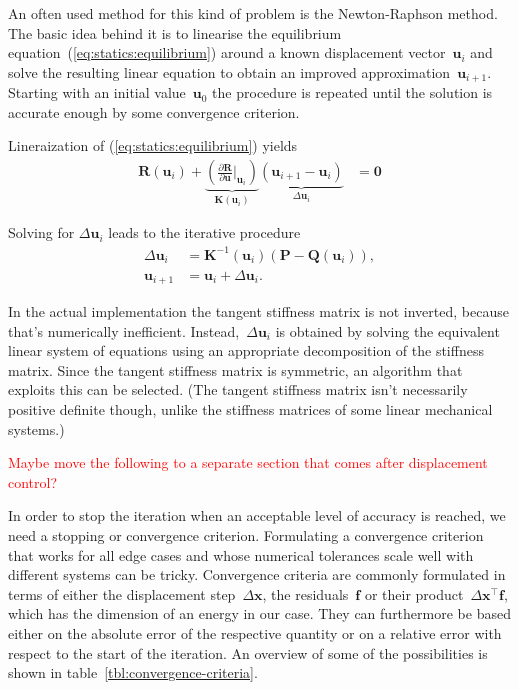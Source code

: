 An often used method for this kind of problem is the Newton-Raphson method. The basic idea behind it is to linearise the equilibrium equation~(\ref{eq:statics:equilibrium}) around a known displacement vector~$\boldsymbol{u}_i$ and solve the resulting linear equation to obtain an improved approximation~$\boldsymbol{u}_{i+1}$. Starting with an initial value~$\boldsymbol{u}_0$ the procedure is repeated until the solution is accurate enough by some convergence criterion.

Lineraization of (\ref{eq:statics:equilibrium}) yields
%
\begin{align}
\boldsymbol{R}(\boldsymbol{u}_i) +
\underbrace{
\left(\frac{\partial \boldsymbol{R}}{\partial \boldsymbol{u}}\bigg \vert_{\boldsymbol{u}_i}\right)
}_{\boldsymbol{K}(\boldsymbol{u}_i)}
\underbrace{
(\boldsymbol{u}_{i+1} - \boldsymbol{u}_i)
}_{\Delta\boldsymbol{u}_i} &= \boldsymbol{0}
\end{align}

Solving for $\Delta\boldsymbol{u}_i$ leads to the iterative procedure
%
\begin{align}
\Delta\boldsymbol{u}_i &= \boldsymbol{K}^{-1}(\boldsymbol{u}_i)\left(\boldsymbol{P} - \boldsymbol{Q}(\boldsymbol{u}_i)\right),\\
\boldsymbol{u}_{i+1} &= \boldsymbol{u}_i + \Delta\boldsymbol{u}_i.\label{eq:statics:newton_iteration}
\end{align}

In the actual implementation the tangent stiffness matrix is not inverted, because that's numerically inefficient.
Instead,~$\Delta\boldsymbol{u}_i$ is obtained by solving the equivalent linear system of equations using an appropriate decomposition of the stiffness matrix.
Since the tangent stiffness matrix is symmetric, an algorithm that exploits this can be selected.
(The tangent stiffness matrix isn't necessarily positive definite though, unlike the stiffness matrices of some linear mechanical systems.)

\textcolor{red}{Maybe move the following to a separate section that comes after displacement control?}

In order to stop the iteration when an acceptable level of accuracy is reached, we need a stopping or convergence criterion.
Formulating a convergence criterion that works for all edge cases and whose numerical tolerances scale well with different systems can be tricky.
Convergence criteria are commonly formulated in terms of either the displacement step~$\Delta\boldsymbol{x}$, the residuals~$\boldsymbol{f}$ or their product~$\Delta\boldsymbol{x}^\intercal\boldsymbol{f}$, which has the dimension of an energy in our case.
They can furthermore be based either on the absolute error of the respective quantity or on a relative error with respect to the start of the iteration.
An overview of some of the possibilities is shown in table~\ref{tbl:convergence-criteria}.


